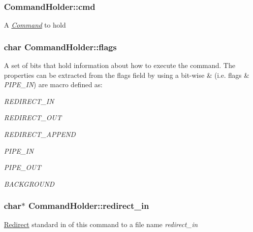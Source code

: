 \subsubsection[{\texorpdfstring{cmd}{cmd}}]{ Command\+Holder\+::cmd}\hypertarget{structCommandHolder_a83a7e82024a6f736ffebed0792aa12a9}{}\label{structCommandHolder_a83a7e82024a6f736ffebed0792aa12a9}
A {\itshape \hyperlink{unionCommand}{Command}} to hold 
\subsubsection[{\texorpdfstring{flags}{flags}}]{\setlength{\rightskip}{0pt plus 5cm}char Command\+Holder\+::flags}\hypertarget{structCommandHolder_acb381d6ab29bc574dc1ff452adc7847a}{}\label{structCommandHolder_acb381d6ab29bc574dc1ff452adc7847a}
A set of bits that hold information about how to execute the command. The properties can be extracted from the flags field by using a bit-\/wise \& (i.\+e. {\ttfamily flags} \& {\itshape P\+I\+P\+E\+\_\+\+IN}) are macro defined as\+:
\begin{DoxyItemize}
\item {\itshape R\+E\+D\+I\+R\+E\+C\+T\+\_\+\+IN} 
\item {\itshape R\+E\+D\+I\+R\+E\+C\+T\+\_\+\+O\+UT} 
\item {\itshape R\+E\+D\+I\+R\+E\+C\+T\+\_\+\+A\+P\+P\+E\+ND} 
\item {\itshape P\+I\+P\+E\+\_\+\+IN} 
\item {\itshape P\+I\+P\+E\+\_\+\+O\+UT} 
\item {\itshape B\+A\+C\+K\+G\+R\+O\+U\+ND} 
\end{DoxyItemize}
\subsubsection[{\texorpdfstring{redirect\+\_\+in}{redirect\_in}}]{\setlength{\rightskip}{0pt plus 5cm}char$\ast$ Command\+Holder\+::redirect\+\_\+in}\hypertarget{structCommandHolder_a3691bd22096644e8c6be327fc7d0d246}{}\label{structCommandHolder_a3691bd22096644e8c6be327fc7d0d246}
\hyperlink{structRedirect}{Redirect} standard in of this command to a file name {\itshape redirect\+\_\+in} 
